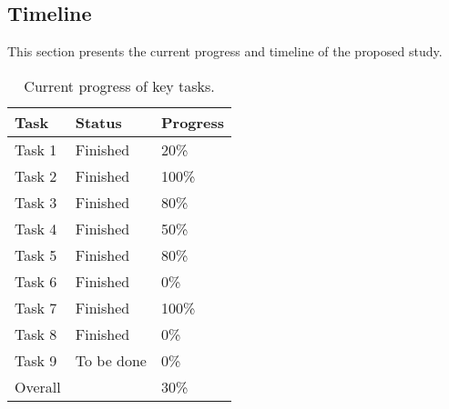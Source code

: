 {
\begin{doublespacing}
\begin{flushleft}

\section{Timeline}
This section presents the current progress and timeline of the proposed study. 

\begin{table}[!htb]
\centering
\begin{tabular}{@{}lll@{}}
\toprule
\textbf{Task}                                   & \textbf{Status}                                    & \textbf{Progress} \\ \midrule
\multicolumn{1}{l|}{Task 1}            & \multicolumn{1}{l|}{Finished}   & 20\%      \\
\multicolumn{1}{l|}{Task 2}         & \multicolumn{1}{l|}{Finished}   & 100\%     \\
\multicolumn{1}{l|}{Task 3}       & \multicolumn{1}{l|}{Finished}                        & 80\%      \\
\multicolumn{1}{l|}{Task 4}              & \multicolumn{1}{l|}{Finished}          & 50\%      \\
\multicolumn{1}{l|}{Task 5} & \multicolumn{1}{l|}{Finished}             & 80\%      \\
\multicolumn{1}{l|}{Task 6}  & \multicolumn{1}{l|}{Finished}                   & 0\%       \\
\multicolumn{1}{l|}{Task 7}          & \multicolumn{1}{l|}{Finished} & 100\%     \\
\multicolumn{1}{l|}{Task 8}     & \multicolumn{1}{l|}{Finished}                    & 0\%       \\
\multicolumn{1}{l|}{Task 9}           & \multicolumn{1}{l|}{To be done}                    & 0\%       \\ \midrule
Overall                                         &                                                    & 30\%      \\ \bottomrule
\end{tabular}
\caption{\label{tab: progress}Current progress of key tasks.}
\end{table}



\end{flushleft}
\end{doublespacing}
}